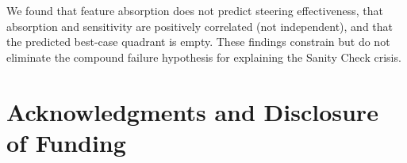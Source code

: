 \documentclass{article}
\begin{document}
We found that feature absorption does not predict steering effectiveness, that absorption and sensitivity are positively correlated (not independent), and that the predicted best-case quadrant is empty. These findings constrain but do not eliminate the compound failure hypothesis for explaining the Sanity Check crisis.

\section*{Acknowledgments and Disclosure of Funding}




\end{document}
